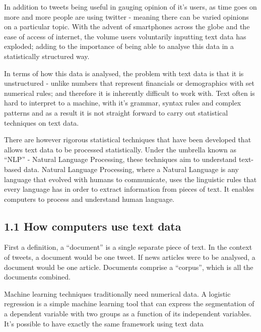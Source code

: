 \documentclass[
]{article}
\begin{document}
In addition to tweets being useful in gauging opinion of it's users, as
time goes on more and more people are using twitter - meaning there can
be varied opinions on a particular topic. With the advent of smartphones
across the globe and the ease of access of internet, the volume users
voluntarily inputting text data has exploded; adding to the importance
of being able to analyse this data in a statistically structured way.

In terms of how this data is analysed, the problem with text data is
that it is unstructured - unlike numbers that represent financials or
demographics with set numerical rules; and therefore it is inherently
difficult to work with. Text often is hard to interpret to a machine,
with it's grammar, syntax rules and complex patterns and as a result it
is not straight forward to carry out statistical techniques on text
data.

There are however rigorous statistical techniques that have been
developed that allows text data to be processed statistically. Under the
umbrella known as ``NLP'' - Natural Language Processing, these
techniques aim to understand text-based data. Natural Language
Processing, where a Natural Language is any language that evolved with
humans to communicate, uses the linguistic rules that every language has
in order to extract information from pieces of text. It enables
computers to process and understand human language.

\hypertarget{how-computers-use-text-data}{%
\subsection{1.1 How computers use text
data}\label{how-computers-use-text-data}}

First a definition, a ``document'' is a single separate piece of text.
In the context of tweets, a document would be one tweet. If news
articles were to be analysed, a document would be one article. Documents
comprise a ``corpus'', which is all the documents combined.

Machine learning techniques traditionally need numerical data. A
logistic regression is a simple machine learning tool that can express
the segmentation of a dependent variable with two groups as a function
of its independent variables. It's possible to have exactly the same
framework using text data
\end{document}
